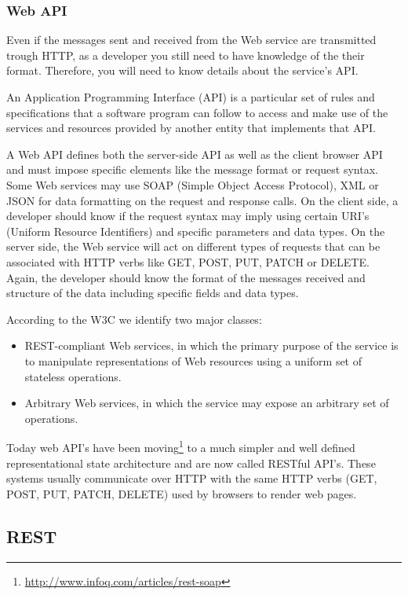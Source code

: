 \subsubsection{Web API}
\label{sub-sub-sec:web-api}

Even if the messages sent and received from the Web service are transmitted trough HTTP, as a developer you still need to have knowledge of the their format. Therefore, you will need to know details about the service's API.

An Application Programming Interface (API) is a particular
set of rules and specifications that a software program can follow to access and make use of the services
and resources provided by another entity that implements that API.

A Web API defines both the server-side API as well as the client browser API and must impose specific elements like the message format or request syntax. Some Web services may use SOAP (Simple Object Access Protocol), XML or JSON for data formatting on the request and response calls. On the client side, a developer should know if the request syntax may imply using certain URI's (Uniform Resource Identifiers) and specific parameters and data types. On the server side, the Web service will act on different types of requests that can be associated with HTTP verbs like GET, POST, PUT, PATCH or DELETE. Again, the developer should know the format of the messages received and structure of the data including specific fields and data types.

According to the W3C \cite{W3C} we identify two major classes:
\begin{itemize}
	\item REST-compliant Web services, in which the primary purpose of the service is to manipulate representations of Web resources using a uniform set of stateless operations.
	\item Arbitrary Web services, in which the service may expose an arbitrary set of operations. 
\end{itemize}

Today web API's have been moving\footnote{\url{http://www.infoq.com/articles/rest-soap}} to a much simpler and well defined representational state architecture and are now called RESTful API's. These systems usually communicate over HTTP with the same HTTP verbs (GET, POST, PUT, PATCH, DELETE) used by browsers to render web pages.

\subsection{REST}
\label{sub-sec:rest}

